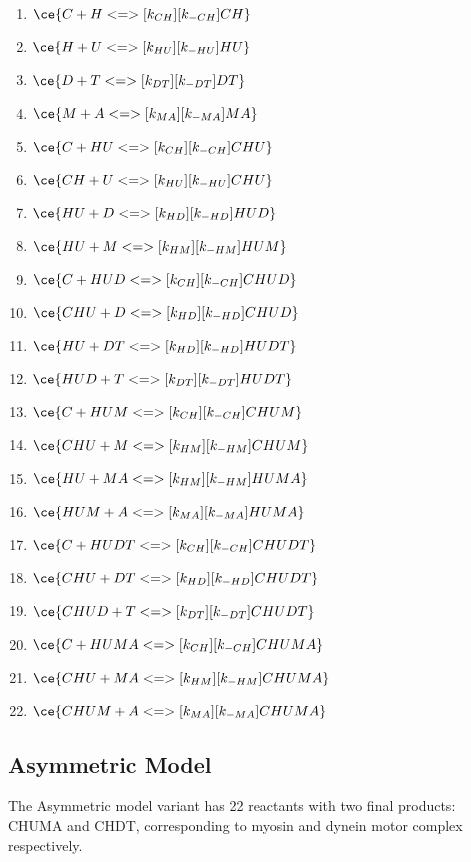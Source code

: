 \begin{enumerate}
\item $\ce{C + H <=>[k_{CH}][k_{-CH}] CH}$ %
\item $\ce{H + U <=>[k_{HU}][k_{-HU}] HU}$ %
\item $\ce{D + T <=>[k_{DT}][k_{-DT}] DT}$ %
\item $\ce{M + A <=>[k_{MA}][k_{-MA}] MA}$ %

\item $\ce{C + HU <=>[k_{CH}][k_{-CH}] CHU}$ %
\item $\ce{CH + U <=>[k_{HU}][k_{-HU}] CHU}$ %
\item $\ce{HU + D <=>[k_{HD}][k_{-HD}] HUD}$ %
\item $\ce{HU + M <=>[k_{HM}][k_{-HM}] HUM}$ %

\item $\ce{C + HUD <=>[k_{CH}][k_{-CH}] CHUD}$ %
\item $\ce{CHU + D <=>[k_{HD}][k_{-HD}] CHUD}$ %
\item $\ce{HU + DT <=>[k_{HD}][k_{-HD}] HUDT}$ %
\item $\ce{HUD + T <=>[k_{DT}][k_{-DT}] HUDT}$ %
\item $\ce{C + HUM <=>[k_{CH}][k_{-CH}] CHUM}$ %
\item $\ce{CHU + M <=>[k_{HM}][k_{-HM}] CHUM}$ %
\item $\ce{HU + MA <=>[k_{HM}][k_{-HM}] HUMA}$ %
\item $\ce{HUM + A <=>[k_{MA}][k_{-MA}] HUMA}$ %

\item $\ce{C + HUDT <=>[k_{CH}][k_{-CH}] CHUDT}$ %
\item $\ce{CHU + DT <=>[k_{HD}][k_{-HD}] CHUDT}$ %
\item $\ce{CHUD + T <=>[k_{DT}][k_{-DT}] CHUDT}$ %
\item $\ce{C + HUMA <=>[k_{CH}][k_{-CH}] CHUMA}$ %
\item $\ce{CHU + MA <=>[k_{HM}][k_{-HM}] CHUMA}$ %
\item $\ce{CHUM + A <=>[k_{MA}][k_{-MA}] CHUMA}$ %
\end{enumerate}

\subsection{Asymmetric Model}

The Asymmetric model variant has 22 reactants with two final products: CHUMA and CHDT, corresponding to myosin and dynein motor complex respectively.

